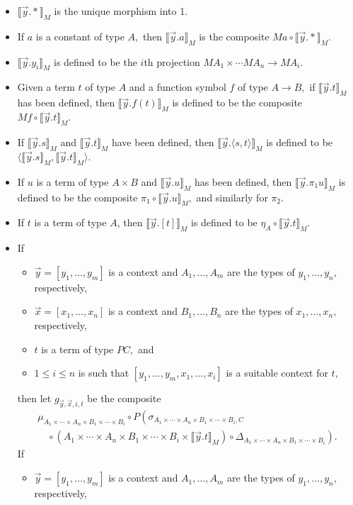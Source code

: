 \documentclass{article}
\newcommand{\interp}[1]{\llbracket #1 \rrbracket}
\newcommand{\iym}[1]{\interp{\vec{y}.#1}_M}
\begin{document}
\begin{itemize}
  \item $\iym{*}$ is the unique morphism into 1.
  \item If $a$ is a constant of type $A,$ then $\iym{a}$ is the composite $Ma \circ \iym{*}.$
  \item $\iym{y_i}$ is defined to be the $i$th projection $MA_1 \times \cdots MA_n \to MA_i.$
  \item Given a term $t$ of type $A$ and a function symbol $f$ of type $A\to B,$ if $\iym{t}$ has been defined, then $\iym{f(t)}$ is defined to be the composite $Mf \circ \iym{t}.$
  \item If $\iym{s}$ and $\iym{t}$ have been defined, then $\iym{\langle s, t \rangle}$ is defined to be $\langle \iym{s}, \iym{t} \rangle.$
  \item If $u$ is a term of type $A\times B$ and $\iym{u}$ has been defined, then $\iym{\pi_1u}$ is defined to be the composite $\pi_1 \circ \iym{u},$ and similarly for $\pi_2.$
  \item If $t$ is a term of type $A$, then $\iym{[t]}$ is defined to be $\eta_A \circ \iym{t}.$
  \item If 
    \begin{itemize}
      \item $\vec{y} = [y_1, \ldots, y_m]$ is a context and $A_1, \ldots, A_m$ are the types of $y_1, \ldots, y_n,$ respectively,
      \item $\vec{x} = [x_1, \ldots, x_n]$ is a context and $B_1, \ldots, B_n$ are the types of $x_1, \ldots, x_n,$ respectively,
      \item $t$ is a term of type $PC,$ and
      \item $1 \le i \le n$ is such that $[y_1, \ldots, y_m, x_1, \ldots, x_i]$ is a suitable context for $t,$
    \end{itemize}  
    then let $g_{\vec{y}, \vec{x}, i, t}$ be the composite 
    \[ \begin{array}{l} \displaystyle \mu_{A_1 \times \cdots \times A_n \times B_1 \times \cdots \times B_i} \circ P\left(\sigma_{A_1 \times \cdots \times A_n \times B_1\times \cdots \times B_i, C} \right. \\ \displaystyle \left. \quad \circ \left(A_1 \times \cdots \times A_n \times B_1\times \cdots \times B_i \times \iym{t}\right) \circ \Delta_{A_1 \times \cdots \times A_n \times B_1\times \cdots \times B_i}\right). \end{array}\]
    If
    \begin{itemize}
      \item $\vec{y} = [y_1, \ldots, y_m]$ is a context and $A_1, \ldots, A_m$ are the types of $y_1, \ldots, y_n,$ respectively,

\end{itemize}
\end{itemize}
\end{document}
